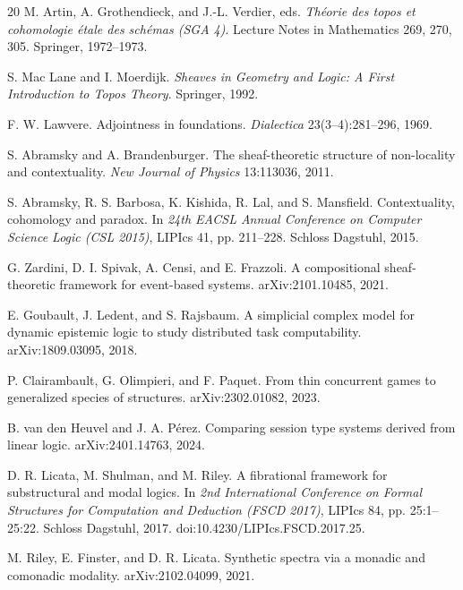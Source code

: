 \documentclass[11pt]{article}
\begin{document}
\begin{thebibliography}{20}
M. Artin, A. Grothendieck, and J.-L. Verdier, eds.
\emph{Th\'eorie des topos et cohomologie \'etale des sch\'emas (SGA 4)}.
Lecture Notes in Mathematics 269, 270, 305. Springer, 1972--1973.

S. Mac Lane and I. Moerdijk.
\emph{Sheaves in Geometry and Logic: A First Introduction to Topos Theory}.
Springer, 1992.

F. W. Lawvere.
Adjointness in foundations.
\emph{Dialectica} 23(3--4):281--296, 1969.

S. Abramsky and A. Brandenburger.
The sheaf-theoretic structure of non-locality and contextuality.
\emph{New Journal of Physics} 13:113036, 2011.

S. Abramsky, R. S. Barbosa, K. Kishida, R. Lal, and S. Mansfield.
Contextuality, cohomology and paradox.
In \emph{24th EACSL Annual Conference on Computer Science Logic (CSL 2015)},
LIPIcs 41, pp. 211--228. Schloss Dagstuhl, 2015.

G. Zardini, D. I. Spivak, A. Censi, and E. Frazzoli.
A compositional sheaf-theoretic framework for event-based systems.
arXiv:2101.10485, 2021.

E. Goubault, J. Ledent, and S. Rajsbaum.
A simplicial complex model for dynamic epistemic logic to study distributed task
computability.
arXiv:1809.03095, 2018.

P. Clairambault, G. Olimpieri, and F. Paquet.
From thin concurrent games to generalized species of structures.
arXiv:2302.01082, 2023.

B. van den Heuvel and J. A. P\'erez.
Comparing session type systems derived from linear logic.
arXiv:2401.14763, 2024.

D. R. Licata, M. Shulman, and M. Riley.
A fibrational framework for substructural and modal logics.
In \emph{2nd International Conference on Formal Structures for Computation and
Deduction (FSCD 2017)}, LIPIcs 84, pp. 25:1--25:22. Schloss Dagstuhl, 2017.
doi:10.4230/LIPIcs.FSCD.2017.25.

M. Riley, E. Finster, and D. R. Licata.
Synthetic spectra via a monadic and comonadic modality.
arXiv:2102.04099, 2021.

\end{thebibliography}
\end{document}
